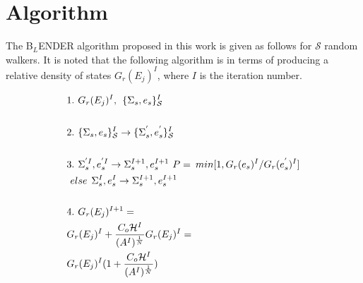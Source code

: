 \documentclass[aps,pre,reprint,superscriptaddress,showkeys]{revtex4-2}
\begin{document}
\section{Algorithm}
\label{sec1}
The B$_{L}$ENDER algorithm proposed in this work  is given as follows for $\mathcal{S}$ random walkers. It is noted that the following algorithm is in terms of producing a relative density of states $G_{r}(E_j)^I$, where $I$ is the iteration number. 

\begin{equation}
\begin{split}
&1.\hspace{0.125cm} G_{r}(E_j)^I ,\hspace{0.15cm}  \{\Sigma_{s},e_s\}_{\mathcal{S}}^I\\
\\
&2. \hspace{0.125cm}\{\Sigma_{s},e_s\}_{\mathcal{S}}^I \rightarrow  \{\Sigma_{s}^{'},e_s^{'}\}_{\mathcal{S}}^I\\
\\
&3. \hspace{0.125cm} \Sigma_{s}^{'I}, e_s^{'I} \rightarrow \Sigma_{s}^{I+1},e_s^{I+1}   \hspace{0.125cm} P = \hspace{0.075cm} min [1, G_r(e_s)^{I}/G_r(e_s^{'})^{I}]\\
& \hspace{0.125cm}else  \hspace{0.15cm} \Sigma_{s}^I, e_s^I \rightarrow \Sigma_{s}^{I+1}, e_s^{I+1}\\
\\
&4. \hspace{0.125cm} G_{r}(E_j)^{I+1} =  \\
& G_{r}(E_j)^{I} + \frac{C_o \mathcal{H}^I }{ (A^{I})^{\frac{1}{N} } }G_{r}(E_j)^{I} = \\
& G_{r}(E_j)^{I}( 1 +  \frac{C_o \mathcal{H}^I }{ (A^{I})^{\frac{1}{N} } } )\\
\end{split}
\label{blender}
\end{equation}
\end{document}
